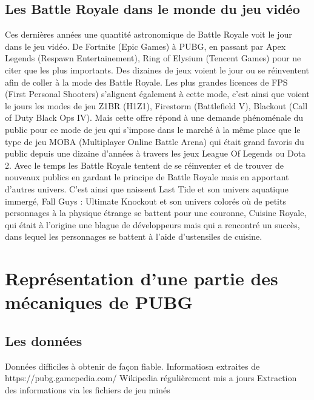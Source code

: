 \subsection{Les Battle Royale dans le monde du jeu vidéo}
Ces dernières années une quantité astronomique de Battle Royale voit le jour dans le jeu vidéo. De Fortnite (Epic Games) à PUBG, en passant par Apex Legends (Respawn Entertainement), Ring of Elysium (Tencent Games) pour ne citer que les plus importants. Des dizaines de jeux voient le jour ou se réinventent afin de coller à la mode des Battle Royale. Les plus grandes licences de FPS (First Personal Shooters) s'alignent également à cette mode, c'est ainsi que voient le jours les modes de jeu Z1BR (H1Z1), Firestorm (Battlefield V), Blackout (Call of Duty Black Ops IV). Mais cette offre répond à une demande phénoménale du public pour ce mode de jeu qui s'impose dans le marché à la même place que le type de jeu MOBA (Multiplayer Online Battle Arena) qui était grand favoris du public depuis une dizaine d'années à travers les jeux League Of Legends ou Dota 2. Avec le temps les Battle Royale tentent de se réinventer et de trouver de nouveaux publics en gardant le principe de Battle Royale mais en apportant d'autres univers. C'est ainsi que naissent Last Tide et son univers aquatique immergé, Fall Guys : Ultimate Knockout et son univers colorés où de petits personnages à la physique étrange se battent pour une couronne, Cuisine Royale, qui était à l'origine une blague de développeurs mais qui a rencontré un succès, dans lequel les personnages se battent à l'aide d'ustensiles de cuisine.

\section{Représentation d'une partie des mécaniques de PUBG}
\subsection{Les données}
Données difficiles à obtenir de façon fiable.
Informatiosn extraites de https://pubg.gamepedia.com/
Wikipedia régulièrement mis a jours
Extraction des informations via les fichiers de jeu minés


